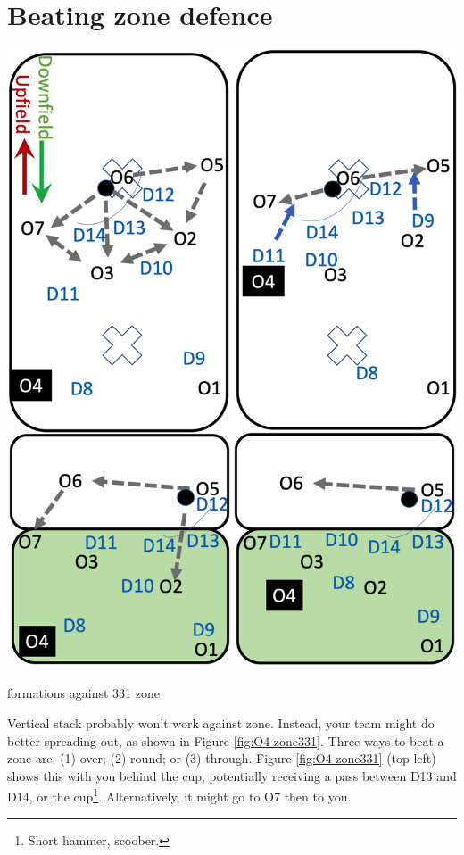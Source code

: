 \documentclass{tufte-handout}
\begin{document}
\section{Beating zone defence}\label{sec:zone}
\begin{marginfigure}%
  \includegraphics[width=\linewidth]{O4-zone331}
  \caption{formations against 331 zone}
  \label{fig:O4-zone331}
\end{marginfigure}
Vertical stack 
probably won't work
against zone. 
Instead, your 
team might do better spreading out, 
as shown 
in Figure \ref{fig:O4-zone331}. 
Three ways to beat a zone are:
(1) over;
(2) round; or
(3) through. 
Figure \ref{fig:O4-zone331}
(top left)
shows this 
with you 
behind the cup, 
potentially receiving a pass 
between 
D13 
and D14, or 
the cup\footnote{
Short hammer, scoober.}.
Alternatively, 
it might go 
to O7 then 
 to you.
\end{document}
